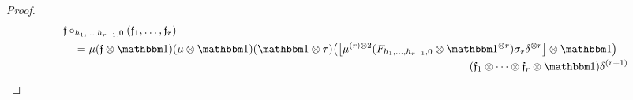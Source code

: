 \documentclass[\MainFolder/Text.tex]{subfiles}
\begin{document}
\begin{proof}
\begin{align*}
&\MVMorF\circ_{h_1,\dotsc,h_{r-1},0}(\MVMorF_1,\dotsc,\MVMorF_r) \\
&\quad=\begin{multlined}[t]\MVProd(\MVMorF\otimes\Id)(\MVProd\otimes\Id)(\Id\otimes\tau)\bigl(\bigl[\MVProd^{(r)\otimes 2}(F_{h_1,\dotsc,h_{r-1},0}\otimes\Id^{\otimes r})\sigma_r\MVCoProd^{\otimes r}\bigr]\otimes\Id\bigr)\\(\MVMorF_1\otimes\dotsb\otimes\MVMorF_{r}\otimes\Id)\MVCoProd^{(r+1)}\end{multlined}\\

\end{align*}
\end{proof}
\end{document}
